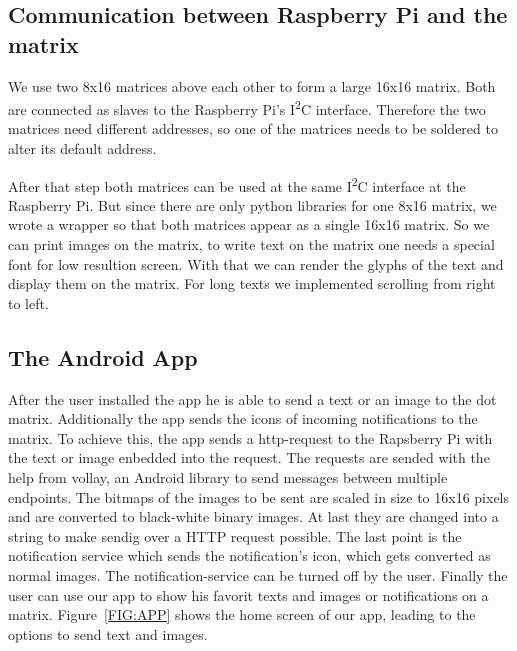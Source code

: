 \documentclass[conference]{IEEEtran}
\begin{document}
\subsection{Communication between Raspberry Pi and the matrix}
We use two 8x16 matrices above each other to form a large 16x16 matrix. Both are connected as slaves to the Raspberry Pi's I\textsuperscript{2}C interface. Therefore the two matrices need different addresses, so one of the matrices needs to be soldered to alter its default address.

After that step both matrices can be used at the same I\textsuperscript{2}C interface at the Raspberry Pi. But since there are only python libraries for one 8x16 matrix, we wrote a wrapper so that both matrices appear as a single 16x16 matrix. So we can print images on the matrix, to write text on the matrix one needs a special font for low resultion screen. With that we can render the glyphs of the text and display them on the matrix. For long texts we implemented scrolling from right to left.

\subsection{The Android App}
After the user installed the app he is able to send a text or an image to the dot matrix. Additionally the app sends the icons of incoming notifications to the matrix. To achieve this, the app sends a http-request to the Rapsberry Pi with the text or image enbedded into the request. The requests are sended with the help from vollay, an Android library to send messages between multiple endpoints. The bitmaps of the images to be sent are scaled in size to 16x16 pixels and are converted to black-white binary images. At last they are changed into a string to make sendig over a HTTP request possible. The last point is the notification service which sends the notification's icon, which gets converted as normal images. The notification-service can be turned off by the user. Finally the user can use our app to show his favorit texts and images or notifications on a matrix. Figure~\ref{FIG:APP} shows the home screen of our app, leading to the options to send text and images.
\end{document}
